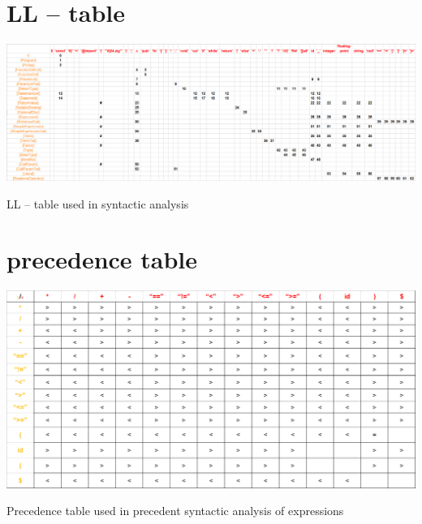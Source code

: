 \documentclass[a4paper, 11pt]{article}
\begin{document}
	\begin{table}[!ht]
        \section{LL -- table}
		\centering
		\includegraphics[width=1\linewidth]{LL_table.pdf}
		\caption{LL -- table used in syntactic analysis}
		\label{table:ll_table}
	\end{table}


	
	\begin{table}[!ht]
        \section{precedence table}
		\centering
		\includegraphics[width=0.7\linewidth]{precedence_table.pdf}
		\caption{Precedence table used in precedent syntactic analysis of expressions}
		\label{table:precedence table.pdf}
	\end{table}
\end{document}
